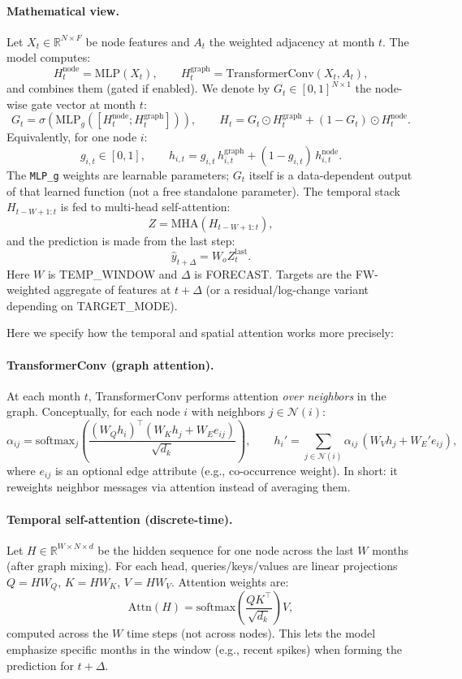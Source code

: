 \documentclass{article}
\begin{document}
\paragraph{Mathematical view.}
Let $X_t \in \mathbb{R}^{N \times F}$ be node features and $A_t$ the weighted adjacency at month $t$.
The model computes:
\[
H_t^{\text{node}} = \mathrm{MLP}(X_t), \qquad
H_t^{\text{graph}} = \mathrm{TransformerConv}(X_t, A_t),
\]
and combines them (gated if enabled). We denote by $G_t \in [0,1]^{N \times 1}$ the
node-wise gate vector at month $t$:
\[
G_t = \sigma\!\left(\mathrm{MLP}_g\!\left([H_t^{\text{node}} ; H_t^{\text{graph}}]\right)\right), \qquad
H_t = G_t \odot H_t^{\text{graph}} + (1-G_t)\odot H_t^{\text{node}}.
\]
Equivalently, for one node $i$:
\[
g_{i,t}\in[0,1], \qquad
h_{i,t} = g_{i,t}\,h_{i,t}^{\text{graph}} + (1-g_{i,t})\,h_{i,t}^{\text{node}}.
\]
The \texttt{MLP\_g} weights are learnable parameters; $G_t$ itself is a data-dependent
output of that learned function (not a free standalone parameter).
The temporal stack $H_{t-W+1:t}$ is fed to multi-head self-attention:
\[
Z = \mathrm{MHA}(H_{t-W+1:t}),
\]
and the prediction is made from the last step:
\[
\hat{y}_{t+\Delta} = W_o Z_{t}^{\text{last}}.
\]
Here $W$ is TEMP\_WINDOW and $\Delta$ is FORECAST. Targets are the FW-weighted aggregate of features
at $t+\Delta$ (or a residual/log-change variant depending on TARGET\_MODE).

Here we specify how the temporal and spatial attention works more precisely:

\paragraph{TransformerConv (graph attention).}
At each month $t$, TransformerConv performs attention \emph{over neighbors} in the graph.
Conceptually, for each node $i$ with neighbors $j \in \mathcal{N}(i)$:
\[
\alpha_{ij} = \mathrm{softmax}_j\!\left(\frac{(W_Q h_i)^\top (W_K h_j + W_E e_{ij})}{\sqrt{d_k}}\right),
\qquad
h_i' = \sum_{j \in \mathcal{N}(i)} \alpha_{ij}\,(W_V h_j + W_E' e_{ij}),
\]
where $e_{ij}$ is an optional edge attribute (e.g., co-occurrence weight).
In short: it reweights neighbor messages via attention instead of averaging them.


\paragraph{Temporal self-attention (discrete-time).}
Let $H \in \mathbb{R}^{W \times N \times d}$ be the hidden sequence for one node across the last
$W$ months (after graph mixing). For each head, queries/keys/values are linear projections
$Q = HW_Q$, $K = HW_K$, $V = HW_V$. Attention weights are:
\[
\mathrm{Attn}(H) = \mathrm{softmax}\!\left(\frac{QK^\top}{\sqrt{d_k}}\right) V,
\]
computed across the $W$ time steps (not across nodes). This lets the model emphasize specific
months in the window (e.g., recent spikes) when forming the prediction for $t+\Delta$.
\end{document}
